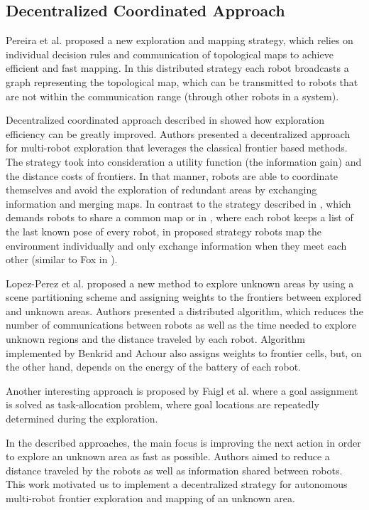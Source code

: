 \subsection{Decentralized Coordinated Approach}

Pereira et al. \cite{Pereira2015} proposed a new exploration and mapping strategy, which relies on individual decision rules and communication of topological maps to achieve efficient and fast mapping. In this distributed strategy each robot broadcasts a graph representing the topological map, which can be transmitted to robots that are not within the communication range (through other robots in a system). 

Decentralized coordinated approach described in \cite{Colares2016} showed how exploration efficiency can be greatly improved. Authors presented a decentralized approach for multi-robot exploration that leverages the classical frontier based methods. The strategy took into consideration a utility function (the information gain) and the distance costs of frontiers. In that manner, robots are able to coordinate themselves and avoid the exploration of redundant areas by exchanging information and merging maps. 
In contrast to the strategy described in \cite{Burgard2000}, which demands robots to share a common map or in \cite{Burgard2005}, where each robot keeps a list of the last known pose of every robot, in proposed strategy robots map the environment individually and only exchange information when they meet each other (similar to Fox in \cite{Fox2006}).

Lopez-Perez et al. \cite{LopezPerez2018} proposed a new method to explore unknown areas by using a scene partitioning scheme and assigning weights to the frontiers between explored and unknown areas. Authors presented a distributed algorithm, which reduces the number of communications between robots as well as the time needed to explore unknown regions and the distance traveled by each robot. Algorithm implemented by Benkrid and Achour \cite{Benkrid2017} also assigns weights to frontier cells, but, on the other hand, depends on the energy of the battery of each robot.

Another interesting approach is proposed by Faigl et al. \cite{Faigl2015} where a goal assignment is solved as task-allocation problem, where goal locations are repeatedly determined during the exploration. 

In the described approaches, the main focus is improving the next action in order to explore an unknown area as fast as possible. Authors aimed to reduce a distance traveled by the robots as well as information shared between robots. This work motivated us to implement a decentralized strategy for autonomous multi-robot frontier exploration and mapping of an unknown area. 

